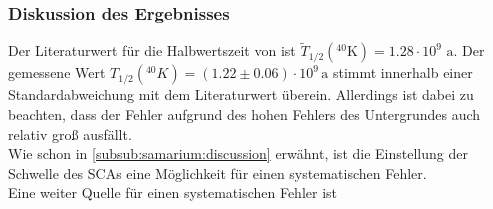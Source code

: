 \subsubsection{Diskussion des Ergebnisses}
Der Literaturwert für die Halbwertszeit von \kalium ist $\tilde{T}_{1/2}({}^{40}\text{K}) = 1.28 \cdot 10^{9} \text{ a}$. Der gemessene Wert 
$T_{1/2} \left( {}^{40} K \right) = (1.22 \pm 0.06) \cdot 10^9\,\text{a}$ stimmt innerhalb einer Standardabweichung mit dem Literaturwert überein. 
Allerdings ist dabei zu beachten, dass der Fehler aufgrund des hohen Fehlers des Untergrundes auch relativ groß ausfällt. \\
Wie schon in \ref{subsub:samarium:discussion} erwähnt, ist die Einstellung der Schwelle des SCAs eine Möglichkeit für einen systematischen Fehler. \\
Eine weiter Quelle für einen systematischen Fehler ist 
